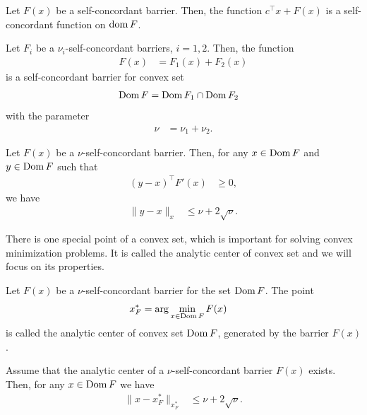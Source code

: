 \begin{theorem}
  Let $F(x)$ be a self-concordant barrier. Then, the function $c^\top x + F(x)$ is a self-concordant function on $\operatorname{dom} F$.
\end{theorem}

\begin{theorem}
  Let $F_i$ be a $\nu_i$-self-concordant barriers, $i = 1,2$. Then, the function
  \begin{align}
    F(x) &= F_1(x) + F_2(x)
  \end{align}
  is a self-concordant barrier for convex set
  \begin{align}
    \operatorname{Dom} F &= \operatorname{Dom} F_1 \cap \operatorname{Dom} F_2
  \end{align}
  with the parameter
  \begin{align}
    \nu &= \nu_1 + \nu_2.
  \end{align}
\end{theorem}

\begin{theorem}
  Let $F(x)$ be a $\nu$-self-concordant barrier. Then, for any $x\in\operatorname{Dom} F$ and $y\in\operatorname{Dom} F$ such that
  \begin{align}
    (y-x)^\top F'(x) &\geq 0,
  \end{align}
  we have
  \begin{align}
    \|y-x\|_x &\leq \nu + 2\sqrt{\nu}.
  \end{align}
\end{theorem}

There is one special point of a convex set, which is important for solving convex minimization problems.
It is called the analytic center of convex set and we will focus on its properties.

\begin{definition}
  Let $F(x)$ be a $\nu$-self-concordant barrier for the set $\operatorname{Dom} F$. The point
  \begin{align}
    x^*_F &= \arg \min_{x\in\Dom F} F(x) \labeleq{SDP:scb:ac}
  \end{align}
  is called the analytic center of convex set $\operatorname{Dom} F$, generated by the barrier $F(x)$.
\end{definition}

\begin{theorem}
  Assume that the analytic center of a $\nu$-self-concordant barrier $F(x)$ exists. Then, for any $x\in\operatorname{Dom} F$ we have
  \begin{align}
    \|x-x^*_F\|_{x^*_F} &\leq \nu + 2\sqrt{\nu}.
  \end{align}
\end{theorem}


